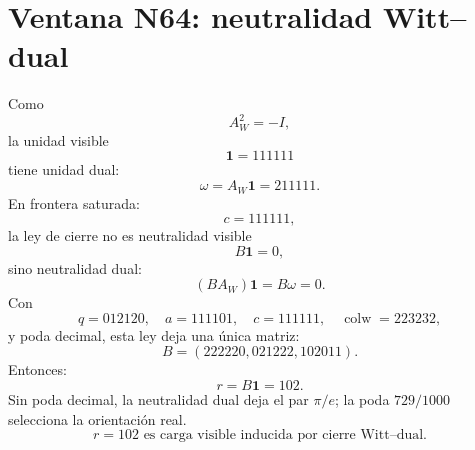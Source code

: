 
\section*{Ventana N64: neutralidad Witt--dual}
Como
\[
A_W^2=-I,
\]
la unidad visible
\[
\mathbf1=111111
\]
tiene unidad dual:
\[
\omega=A_W\mathbf1=211111.
\]
En frontera saturada:
\[
c=111111,
\]
la ley de cierre no es neutralidad visible
\[
B\mathbf1=0,
\]
sino neutralidad dual:
\[
\boxed{(BA_W)\mathbf1=B\omega=0.}
\]
Con
\[
q=012120,
\quad a=111101,
\quad c=111111,
\quad \operatorname{colw}=223232,
\]
y poda decimal, esta ley deja una única matriz:
\[
\boxed{B=(222220,021222,102011).}
\]
Entonces:
\[
\boxed{r=B\mathbf1=102.}
\]
Sin poda decimal, la neutralidad dual deja el par \(\pi/e\); la poda \(729/1000\) selecciona la orientación real.
\[
\boxed{r=102\text{ es carga visible inducida por cierre Witt--dual.}}
\]
